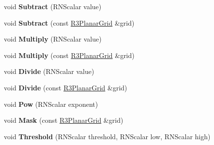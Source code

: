 \begin{DoxyCompactItemize}
\item 
void {\bfseries Subtract} (R\+N\+Scalar value)\hypertarget{class_r3_planar_grid_abbd7dfd7f265cc32d03d500899749dc8}{}\label{class_r3_planar_grid_abbd7dfd7f265cc32d03d500899749dc8}

\item 
void {\bfseries Subtract} (const \hyperlink{class_r3_planar_grid}{R3\+Planar\+Grid} \&grid)\hypertarget{class_r3_planar_grid_a9c3bab037ca2aa984a72892e770e1dd0}{}\label{class_r3_planar_grid_a9c3bab037ca2aa984a72892e770e1dd0}

\item 
void {\bfseries Multiply} (R\+N\+Scalar value)\hypertarget{class_r3_planar_grid_ac31480890a303f9a21e976c876a483c8}{}\label{class_r3_planar_grid_ac31480890a303f9a21e976c876a483c8}

\item 
void {\bfseries Multiply} (const \hyperlink{class_r3_planar_grid}{R3\+Planar\+Grid} \&grid)\hypertarget{class_r3_planar_grid_a6c1f0ae12f6b01b4bfe4e304bd187b51}{}\label{class_r3_planar_grid_a6c1f0ae12f6b01b4bfe4e304bd187b51}

\item 
void {\bfseries Divide} (R\+N\+Scalar value)\hypertarget{class_r3_planar_grid_a974aa208a17942acb139dd184c5cbfb0}{}\label{class_r3_planar_grid_a974aa208a17942acb139dd184c5cbfb0}

\item 
void {\bfseries Divide} (const \hyperlink{class_r3_planar_grid}{R3\+Planar\+Grid} \&grid)\hypertarget{class_r3_planar_grid_a97734a8df9db72f4e2298e2af003e67f}{}\label{class_r3_planar_grid_a97734a8df9db72f4e2298e2af003e67f}

\item 
void {\bfseries Pow} (R\+N\+Scalar exponent)\hypertarget{class_r3_planar_grid_ad6a68640acd74c89f46d6835d538f18b}{}\label{class_r3_planar_grid_ad6a68640acd74c89f46d6835d538f18b}

\item 
void {\bfseries Mask} (const \hyperlink{class_r3_planar_grid}{R3\+Planar\+Grid} \&grid)\hypertarget{class_r3_planar_grid_aa5f453de1dec469f89ffdbd1626b25b0}{}\label{class_r3_planar_grid_aa5f453de1dec469f89ffdbd1626b25b0}

\item 
void {\bfseries Threshold} (R\+N\+Scalar threshold, R\+N\+Scalar low, R\+N\+Scalar high)\hypertarget{class_r3_planar_grid_a7405a20260438ac2f3fafce71a21dc6a}{}\label{class_r3_planar_grid_a7405a20260438ac2f3fafce71a21dc6a}


\end{DoxyCompactItemize}
